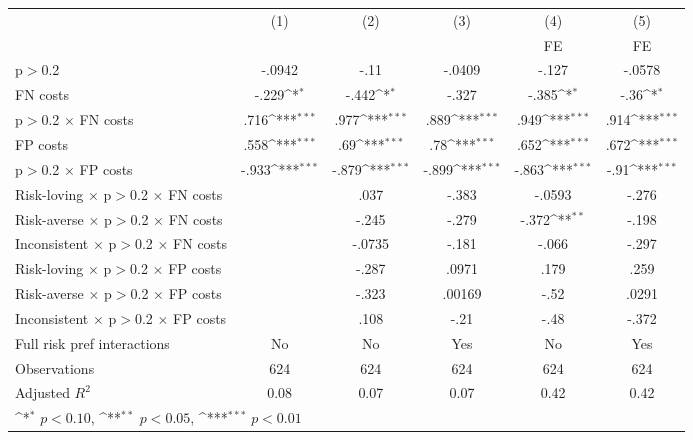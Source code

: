 {
\def\sym#1{\ifmmode^{#1}\else\(^{#1}\)\fi}
\begin{tabular}{l*{5}{c}}
\hline\hline
                &\multicolumn{1}{c}{(1)}&\multicolumn{1}{c}{(2)}&\multicolumn{1}{c}{(3)}&\multicolumn{1}{c}{(4)}&\multicolumn{1}{c}{(5)}\\
                &\multicolumn{1}{c}{}&\multicolumn{1}{c}{}&\multicolumn{1}{c}{}&\multicolumn{1}{c}{FE}&\multicolumn{1}{c}{FE}\\
\hline
p$>$0.2         &   -.0942         &     -.11         &   -.0409         &    -.127         &   -.0578         \\
FN costs        &    -.229\sym{*}  &    -.442\sym{*}  &    -.327         &    -.385\sym{*}  &     -.36\sym{*}  \\
p$>$0.2 $\times$ FN costs&     .716\sym{***}&     .977\sym{***}&     .889\sym{***}&     .949\sym{***}&     .914\sym{***}\\
FP costs        &     .558\sym{***}&      .69\sym{***}&      .78\sym{***}&     .652\sym{***}&     .672\sym{***}\\
p$>$0.2 $\times$ FP costs&    -.933\sym{***}&    -.879\sym{***}&    -.899\sym{***}&    -.863\sym{***}&     -.91\sym{***}\\
Risk-loving $\times$ p$>$0.2 $\times$ FN costs&                  &     .037         &    -.383         &   -.0593         &    -.276         \\
Risk-averse $\times$ p$>$0.2 $\times$ FN costs&                  &    -.245         &    -.279         &    -.372\sym{**} &    -.198         \\
Inconsistent $\times$ p$>$0.2 $\times$ FN costs&                  &   -.0735         &    -.181         &    -.066         &    -.297         \\
Risk-loving $\times$ p$>$0.2 $\times$ FP costs&                  &    -.287         &    .0971         &     .179         &     .259         \\
Risk-averse $\times$ p$>$0.2 $\times$ FP costs&                  &    -.323         &   .00169         &     -.52         &    .0291         \\
Inconsistent $\times$ p$>$0.2 $\times$ FP costs&                  &     .108         &     -.21         &     -.48         &    -.372         \\
Full risk pref interactions&       No         &       No         &      Yes         &       No         &      Yes         \\
\hline
Observations    &      624         &      624         &      624         &      624         &      624         \\
Adjusted \(R^{2}\)&     0.08         &     0.07         &     0.07         &     0.42         &     0.42         \\
\hline\hline
\multicolumn{6}{l}{\footnotesize \sym{*} \(p<0.10\), \sym{**} \(p<0.05\), \sym{***} \(p<0.01\)}\\
\end{tabular}
}
